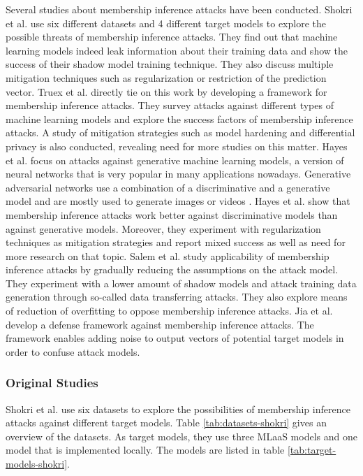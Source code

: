 \documentclass[runningheads]{llncs}
\begin{document}
Several studies about membership inference attacks have been conducted.
Shokri et al. \cite{shokri2017membership} use six different datasets and 4 different target models to explore the possible threats of membership inference attacks. They find out that machine learning models indeed leak information about their training data and show the success of their shadow model training technique. They also discuss multiple mitigation techniques such as regularization or restriction of the prediction vector.
Truex et al. \cite{truex2018towards} directly tie on this work by developing a framework for membership inference attacks. They survey attacks against different types of machine learning models and explore the success factors of membership inference attacks. A study of mitigation strategies such as model hardening and differential privacy is also conducted, revealing need for more studies on this matter. 
Hayes et al. \cite{hayes2017logan} focus on attacks against generative machine learning models, a version of neural networks that is very popular in many applications nowadays. Generative adversarial networks use a combination of a discriminative and a generative model and are mostly used to generate images or videos \cite{goodfellow2014generative}. Hayes et al. show that membership inference attacks work better against discriminative models than against generative models. Moreover, they experiment with regularization techniques as mitigation strategies and report mixed success as well as need for more research on that topic.
Salem et al. \cite{salem2018ml} study applicability of membership inference attacks by gradually reducing the assumptions on the attack model. They experiment with a lower amount of shadow models and attack training data generation through so-called data transferring attacks. They also explore means of reduction of overfitting to oppose membership inference attacks.
Jia et al. \cite{jia2019memguard} develop a defense framework against membership inference attacks. The framework enables adding noise to output vectors of potential target models in order to confuse attack models.

\subsubsection{Original Studies}

Shokri et al. \cite{shokri2017membership} use six datasets to explore the possibilities of membership inference attacks against different target models. Table \ref{tab:datasets-shokri} gives an overview of the datasets. As target models, they use three MLaaS models and one model that is implemented locally. The models are listed in table \ref{tab:target-models-shokri}.
\end{document}

